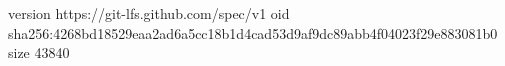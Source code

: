 version https://git-lfs.github.com/spec/v1
oid sha256:4268bd18529eaa2ad6a5cc18b1d4cad53d9af9dc89abb4f04023f29e883081b0
size 43840
